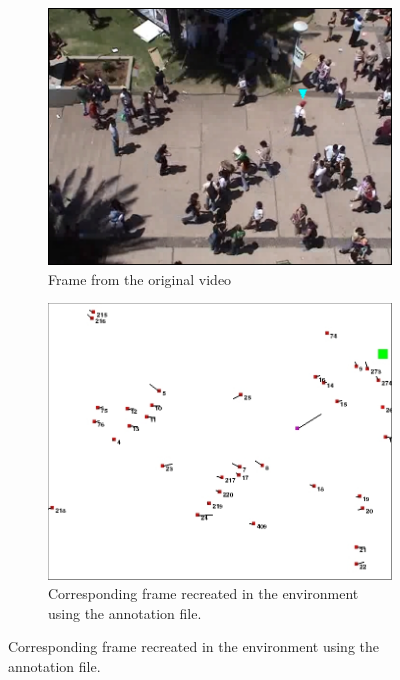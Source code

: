 \begin{enumerate}
\vfill
\begin{figure}[htbp]
	\begin{subfigure}[t]{0.5\textwidth}
		\centering
		\includegraphics[width=.95\linewidth]{figures/video_frame_students_with_agent_pointer.png}
		\caption{Frame from the original video}
		\label{fig:anno_sfig1}
	\end{subfigure}
	\begin{subfigure}[t]{0.5\textwidth}
		\centering
		\includegraphics[width=0.9\linewidth]{figures/env_screenshot.jpg}
		\caption{Corresponding frame recreated in the environment using the annotation file.}
		\label{fig:anno_sfig2}
	\end{subfigure}
\end{figure}
\end{enumerate}


